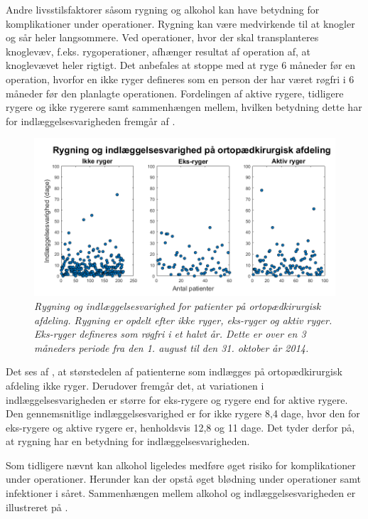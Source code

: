 Andre livsstilsfaktorer såsom rygning og alkohol kan have betydning for komplikationer under operationer. Rygning kan være medvirkende til at knogler og sår heler langsommere. Ved operationer, hvor der skal transplanteres knoglevæv, f.eks. rygoperationer, afhænger resultat af operation af, at knoglevævet heler rigtigt. Det anbefales at stoppe med at ryge 6 måneder før en operation, hvorfor en ikke ryger defineres som en person der har været røgfri i 6 måneder før den planlagte operationen.\cite{Nordjylland2014} Fordelingen af aktive rygere, tidligere rygere og ikke rygerere samt sammenhængen mellem, hvilken betydning dette har for indlæggelsesvarigheden fremgår af .


\begin{figure}[H]
	\centering
	\includegraphics[scale=0.5]{figures/rygerogindlaeg}
	\caption{\textit{Rygning og indlæggelsesvarighed for patienter på ortopædkirurgisk afdeling. Rygning er opdelt efter ikke ryger, eks-ryger og aktiv ryger. Eks-ryger defineres som røgfri i et halvt år. Dette er over en 3 måneders periode fra den 1. august til den 31. oktober år 2014.}}
	\label{rygningogindlaeggelse}
\end{figure}


\noindent
Det ses af , at størstedelen af patienterne som indlægges på ortopædkirurgisk afdeling ikke ryger. Derudover fremgår det, at variationen i indlæggelsesvarigheden er større for eks-rygere og rygere end for aktive rygere. Den gennemsnitlige indlæggelsesvarighed er for ikke rygere 8,4 dage, hvor den for eks-rygere og aktive rygere er, henholdsvis 12,8 og 11 dage. Det tyder derfor på, at rygning har en betydning for indlæggelsesvarigheden.

Som tidligere nævnt kan alkohol ligeledes medføre øget risiko for komplikationer under operationer. Herunder kan der opstå øget blødning under operationer samt infektioner i såret.\cite{Nordjylland2014} Sammenhængen mellem alkohol og indlæggelsesvarigheden er illustreret på  . 


